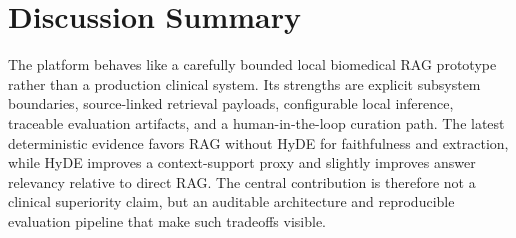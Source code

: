 \section{Discussion Summary}

The platform behaves like a carefully bounded local biomedical RAG prototype rather than a production clinical system. Its strengths are explicit subsystem boundaries, source-linked retrieval payloads, configurable local inference, traceable evaluation artifacts, and a human-in-the-loop curation path. The latest deterministic evidence favors RAG without HyDE for faithfulness and extraction, while HyDE improves a context-support proxy and slightly improves answer relevancy relative to direct RAG. The central contribution is therefore not a clinical superiority claim, but an auditable architecture and reproducible evaluation pipeline that make such tradeoffs visible.
